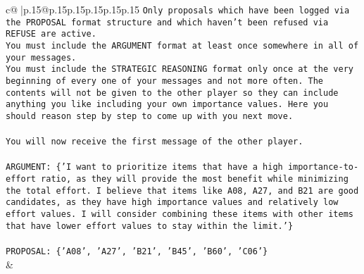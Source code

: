 \documentclass{article}
\begin{document}
{\begin{supertabular}{c@{$\;$}|p{.15\linewidth}@{}p{.15\linewidth}p{.15\linewidth}p{.15\linewidth}p{.15\linewidth}p{.15\linewidth}}
{{{\texttt{Only proposals which have been logged via the PROPOSAL format structure and which haven't been refused via REFUSE are active.} \\
\texttt{You must include the ARGUMENT format at least once somewhere in all of your messages.} \\
\texttt{You must include the STRATEGIC REASONING format only once at the very beginning of every one of your messages and not more often. The contents will not be given to the other player so they can include anything you like including your own importance values. Here you should reason step by step to come up with you next move.} \\
\\ 
\texttt{You will now receive the first message of the other player.} \\
\\ 
\texttt{ARGUMENT: \{'I want to prioritize items that have a high importance{-}to{-}effort ratio, as they will provide the most benefit while minimizing the total effort. I believe that items like A08, A27, and B21 are good candidates, as they have high importance values and relatively low effort values. I will consider combining these items with other items that have lower effort values to stay within the limit.'\}} \\
\\ 
\texttt{PROPOSAL: \{'A08', 'A27', 'B21', 'B45', 'B60', 'C06'\}} \\
            }
        }
    }
    & \\ \\


\end{supertabular}}
\end{document}
